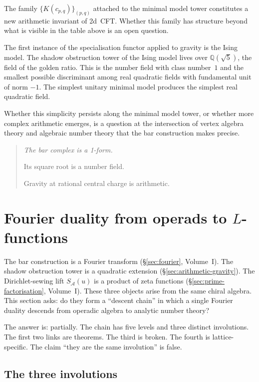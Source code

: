 \documentclass[11pt]{article}
\newcommand{\cA}{\mathcal{A}}
\newcommand{\Q}{\mathbb{Q}}
\begin{document}
The family $\{K(c_{p,q})\}_{(p,q)}$ attached to the minimal
model tower constitutes a new arithmetic invariant of 2d~CFT.
Whether this family has structure beyond what is visible in
the table above is an open question.

The first instance of the specialisation functor applied to
gravity is the Ising model.  The shadow obstruction tower of the
Ising model lives over $\Q(\sqrt{5})$, the field of the
golden ratio.  This is the number field with class number~$1$
and the smallest possible discriminant among real quadratic
fields with fundamental unit of norm $-1$.  The simplest
unitary minimal model produces the simplest real quadratic
field.

Whether this simplicity persists along the minimal model tower,
or whether more complex arithmetic emerges, is a question at
the intersection of vertex algebra theory and algebraic number
theory that the bar construction makes precise.

\begin{quote}\itshape
The bar complex is a 1-form.

Its square root is a number field.

Gravity at rational central charge is arithmetic.
\end{quote}


\section{Fourier duality from operads to $L$-functions}
\label{sec:fourier-operads-L}

The bar construction is a Fourier transform
(\S\ref{sec:fourier}, Volume~I).  The shadow obstruction tower is a
quadratic extension (\S\ref{sec:arithmetic-gravity}).  The
Dirichlet-sewing lift $S_\cA(u)$ is a product of zeta functions
(\S\ref{sec:prime-factorisation}, Volume~I).  These three objects
arise from the same chiral algebra.  This section asks: do they
form a ``descent chain'' in which a single Fourier duality
descends from operadic algebra to analytic number theory?

The answer is: partially.  The chain has five levels and three
distinct involutions.  The first two links are theorems.  The
third is broken.  The fourth is lattice-specific.  The claim
``they are the same involution'' is false.

\subsection{The three involutions}
\end{document}
